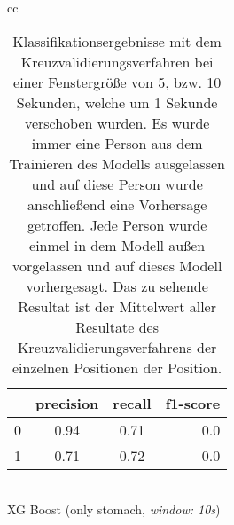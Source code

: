 \begin{table}
\begin{tabular}{cc}
      \begin{minipage}{0.33\textwidth}
          \begin{center}
              \begin{tabular}{ | l | c | c | r |}
                \hline
                 & precision & recall & f1-score \\ \hline
                0 & 0.94 & 0.71 & 0.0 \\ \hline
                1 & 0.71 & 0.72 & 0.0 \\
                \hline
              \end{tabular}
              \smallskip 
              \\ XG Boost (only stomach, \textit{window: 10s})
          \end{center}
      \end{minipage}
  \end{tabular}
  \caption{Klassifikationsergebnisse mit dem Kreuzvalidierungsverfahren bei einer Fenstergröße von 5, bzw. 10 Sekunden, welche um 1 Sekunde verschoben wurden. Es wurde immer eine Person aus dem Trainieren des Modells ausgelassen und auf diese Person wurde anschließend eine Vorhersage getroffen. Jede Person wurde einmel in dem Modell außen vorgelassen und auf dieses Modell vorhergesagt. Das zu sehende Resultat ist der Mittelwert aller Resultate des Kreuzvalidierungsverfahrens der einzelnen Positionen der Position.}
  \label{evaluation:loso_classification_results}
  \end{table}


